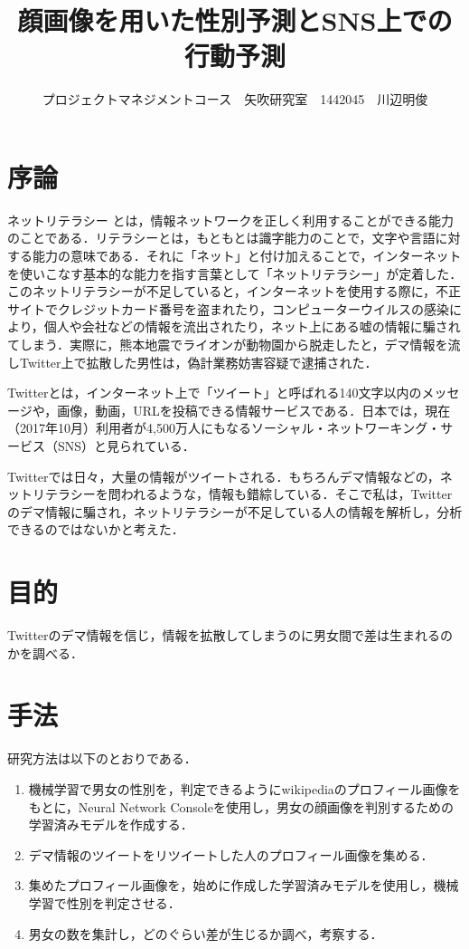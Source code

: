 \documentclass[uplatex,twocolumn,dvipdfmx]{jsarticle}
\title{\vspace{-5mm}\fontsize{14pt}{0pt}\selectfont 顔画像を用いた性別予測とSNS上での行動予測}
\author{\normalsize プロジェクトマネジメントコース　矢吹研究室　1442045　川辺明俊}
\date{}
\begin{document}
\fontsize{10.5pt}{\baselineskip}\selectfont
\maketitle





\section{序論}

ネットリテラシー とは，情報ネットワークを正しく利用することができる能力のことである．リテラシーとは，もともとは識字能力のことで，文字や言語に対する能力の意味である．それに「ネット」と付け加えることで，インターネットを使いこなす基本的な能力を指す言葉として「ネットリテラシー」が定着した\cite{a}．このネットリテラシーが不足していると，インターネットを使用する際に，不正サイトでクレジットカード番号を盗まれたり，コンピューターウイルスの感染により，個人や会社などの情報を流出されたり，ネット上にある嘘の情報に騙されてしまう．実際に，熊本地震でライオンが動物園から脱走したと，デマ情報を流しTwitter上で拡散した男性は，偽計業務妨害容疑で逮捕された．

Twitterとは，インターネット上で「ツイート」と呼ばれる140文字以内のメッセージや，画像，動画，URLを投稿できる情報サービスである．日本では，現在（2017年10月）利用者が4,500万人にもなるソーシャル・ネットワーキング・サービス（SNS）と見られている．

Twitterでは日々，大量の情報がツイートされる．もちろんデマ情報などの，ネットリテラシーを問われるような，情報も錯綜している．そこで私は，Twitterのデマ情報に騙され，ネットリテラシーが不足している人の情報を解析し，分析できるのではないかと考えた．

\section{目的}

Twitterのデマ情報を信じ，情報を拡散してしまうのに男女間で差は生まれるのかを調べる．

\section{手法}

研究方法は以下のとおりである．

\begin{enumerate}
\item 機械学習で男女の性別を，判定できるようにwikipediaのプロフィール画像をもとに，Neural Network Consoleを使用し，男女の顔画像を判別するための学習済みモデルを作成する．
\item デマ情報のツイートをリツイートした人のプロフィール画像を集める．
\item 集めたプロフィール画像を，始めに作成した学習済みモデルを使用し，機械学習で性別を判定させる．
\item 男女の数を集計し，どのぐらい差が生じるか調べ，考察する．
\end{enumerate}
\end{document}
